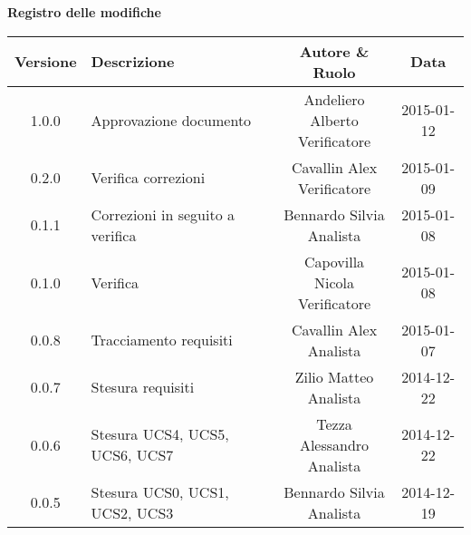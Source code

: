 \begin{center}
\Large{\textbf{Registro delle modifiche}}
\\\vspace{0.5cm}
\normalsize
\begin{tabularx}{\textwidth}{cXcc}
\textbf{Versione} & \textbf{Descrizione} & \textbf{Autore \& Ruolo} & \textbf{Data} \\
\toprule

1.0.0 & Approvazione documento & \multicell{Andeliero Alberto \\ Verificatore} & 2015-01-12  \\\midrule
0.2.0 & Verifica correzioni & \multicell{Cavallin Alex \\ Verificatore} & 2015-01-09\\\midrule
0.1.1 & Correzioni in seguito a verifica & \multicell{Bennardo Silvia \\ Analista} & 2015-01-08 \\\midrule
0.1.0 & Verifica & \multicell{Capovilla Nicola \\ Verificatore} & 2015-01-08 \\\midrule
0.0.8 & Tracciamento requisiti & \multicell{Cavallin Alex \\ Analista} & 2015-01-07 \\\midrule
0.0.7 & Stesura requisiti & \multicell{Zilio Matteo \\ Analista} & 2014-12-22 \\\midrule
0.0.6 & Stesura UCS4, UCS5, UCS6, UCS7 & \multicell{Tezza Alessandro \\ Analista} & 2014-12-22 \\\midrule
0.0.5 & Stesura UCS0, UCS1, UCS2, UCS3 & \multicell{Bennardo Silvia \\ Analista} & 2014-12-19 \\\midrule

\end{tabularx}
\end{center}
